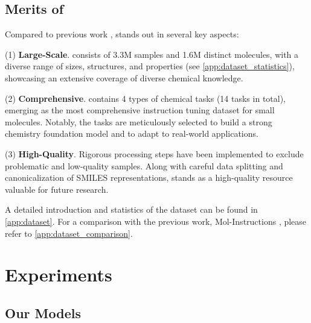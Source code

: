 
\subsection{Merits of \datasetname}

Compared to previous work \citep{fang2023mol,Liang2023a,ye2023drugassist}, \datasetname stands out in several key aspects:

(1) \textbf{Large-Scale}.
\datasetname consists of 3.3M samples and 1.6M distinct molecules, with a diverse range of sizes, structures, and properties (see \cref{app:dataset_statistics}),
showcasing an extensive coverage of diverse chemical knowledge.

(2) \textbf{Comprehensive}.
\datasetname contains 4 types of chemical tasks (14 tasks in total), emerging as the most comprehensive instruction tuning dataset for small molecules. Notably, the tasks are meticulously selected to build a strong chemistry foundation model and to adapt to real-world applications. 

(3) \textbf{High-Quality}.
Rigorous processing steps have been implemented to exclude problematic and low-quality samples. Along with careful data splitting and canonicalization of SMILES representations, \datasetname stands as a high-quality resource valuable for future research.

A detailed introduction and statistics of the \datasetname dataset can be found in \cref{app:dataset}. For a comparison with the previous work, Mol-Instructions \citep{fang2023mol}, please refer to \cref{app:dataset_comparison}.

\section{Experiments}
\label{sec:experiments}

\subsection{Our \modelname Models} 
\label{subsec:our_model}

